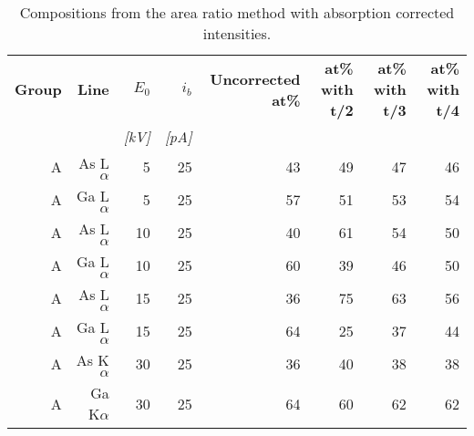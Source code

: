 \begin{table}[phtb]
    \begin{center}
        \caption{
            Compositions from the area ratio method with absorption corrected intensities.
        }
        \label{tab:results:ZAF_corrections_compositions}
        \begin{tabular}{rrrrrrrr}
            \hline
            \textbf{ Group} & \textbf{Line} & \textbf{$E_0$} & \textbf{$i_b$} & \textbf{Uncorrected at\%} & \textbf{at\% with t/2} & \textbf{at\% with t/3} & \textbf{at\% with t/4} \\
            \emph{}         & \emph{}       & \emph{[kV]}    & \emph{[pA]}    & \emph{}                   & \emph{}                & \emph{}                & \emph{}                \\
            \hline
            A               & As L$\alpha$  & 5              & 25             & 43                        & 49                     & 47                     & 46                     \\
            A               & Ga L$\alpha$  & 5              & 25             & 57                        & 51                     & 53                     & 54                     \\
            A               & As L$\alpha$  & 10             & 25             & 40                        & 61                     & 54                     & 50                     \\
            A               & Ga L$\alpha$  & 10             & 25             & 60                        & 39                     & 46                     & 50                     \\
            A               & As L$\alpha$  & 15             & 25             & 36                        & 75                     & 63                     & 56                     \\
            A               & Ga L$\alpha$  & 15             & 25             & 64                        & 25                     & 37                     & 44                     \\
            A               & As K$\alpha$  & 30             & 25             & 36                        & 40                     & 38                     & 38                     \\
            A               & Ga K$\alpha$  & 30             & 25             & 64                        & 60                     & 62                     & 62                     \\

\end{tabular}
\end{center}
\end{table}
